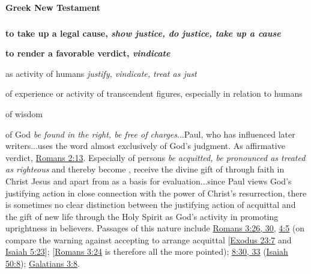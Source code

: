 		\paragraph{Greek New Testament} %
			\label{JUSTIFICATION-GREEK}
			
			\subparagraph{\texorpdfstring{}{}}
				\label{DIKAIOO}
			
				\begin{compactdesc}
					\item[BDAG 220b] \textbf{}
						\begin{compactitem}
							\item[1] \textbf{to take up a legal cause, \textit{show justice, do justice, take up a cause}}
							\item[2] \textbf{to render a favorable verdict, \textit{vindicate}}
							\item[2.a] as activity of humans \textit{justify, vindicate, treat as just}
							\item[2.b] of experience or activity of transcendent figures, especially in relation to humans
							\item[2.b.$\alpha$] of wisdom
							\item[2.b.$\beta$] of God \textit{be found in the right, be free of charges}...Paul, who has influenced later writers...uses the word almost exclusively of God's judgment. As affirmative verdict, \hyperref[ROMANS-2-13]{Romans 2:13}. Especially of persons  \textit{be acquitted, be pronounced as treated as righteous} and thereby become , receive the divine gift of  through faith in Christ Jesus and apart from  as a basis for evaluation...since Paul views God's justifying action in close connection with the power of Christ's resurrection, there is sometimes no clear distinction between the justifying action of acquittal and the gift of new life through the Holy Spirit as God's activity in promoting uprightness in believers. Passages of this nature include \hyperref[ROMANS-3-26]{Romans 3:26, 30}, \hyperref[ROMANS-4-5]{4:5} (on  compare the warning against accepting  to arrange acquittal [\hyperref[EXODUS-23-7]{Exodus 23:7} and \hyperref[ISAIAH-5-23]{Isaiah 5:23}];  [\hyperref[ROMANS-3-24]{Romans 3:24} is therefore all the more pointed); \hyperref[ROMANS-8-30]{8:30, 33} (\hyperref[ISAIAH-50-8]{Isaiah 50:8}); \hyperref[GALATIANS-3-8]{Galatians 3:8}.

\end{compactitem}
\end{compactdesc}
